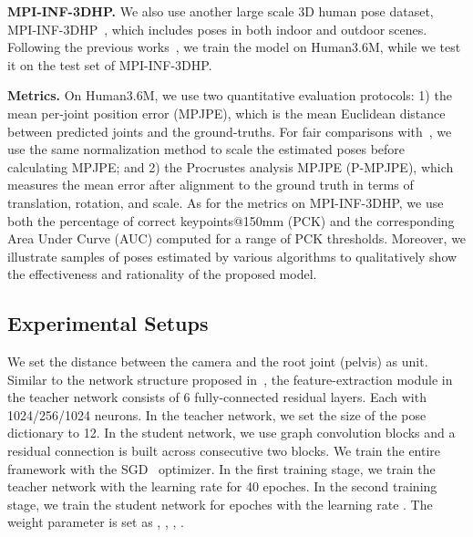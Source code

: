 \documentclass[letterpaper]{article} \usepackage{aaai21}  \usepackage{times}  \usepackage{helvet} \usepackage{courier}  \usepackage[hyphens]{url}  \usepackage{graphicx} \urlstyle{rm} \def\UrlFont{\rm}  \usepackage{natbib}  \usepackage{caption} \frenchspacing  \setlength{\pdfpagewidth}{8.5in}  \setlength{\pdfpageheight}{11in}
\begin{document}
\noindent\textbf{MPI-INF-3DHP.} We also use another large scale 3D human pose dataset, MPI-INF-3DHP~\cite{mehta2017monocular}, which includes poses in both indoor and outdoor scenes. Following the previous works~\cite{kanazawa2018end,mehta2017monocular,zhou2017towards}, we train the model on Human3.6M, while we test it on the test set of MPI-INF-3DHP.

\noindent\textbf{Metrics.}
On Human3.6M, we use two quantitative evaluation protocols: 1) the mean per-joint position error (MPJPE), which is the mean Euclidean distance between predicted joints and the ground-truths. For fair comparisons with~\cite{novotny2019c3dpo,kudo2018unsupervised}, we use the same normalization method to scale the estimated poses before calculating MPJPE; and 2) the Procrustes analysis MPJPE (P-MPJPE), which measures the mean error after alignment to the ground truth in terms of translation, rotation, and scale. As for the metrics on MPI-INF-3DHP, we use both the percentage of correct keypoints@150mm (PCK) and the corresponding Area Under Curve (AUC) computed for a range of PCK thresholds. Moreover, we illustrate samples of poses estimated by various algorithms to qualitatively show the effectiveness and rationality of the proposed model.

\subsection{Experimental Setups}
We set the distance between the camera and the root joint (pelvis)  as  unit. Similar to the network structure proposed in~\cite{novotny2019c3dpo}, the feature-extraction module in the teacher network consists of 6 fully-connected residual layers. Each with 1024/256/1024 neurons. In the teacher network, we set the size of the pose dictionary  to 12. In the student network, we use  graph convolution blocks and a residual connection is built across consecutive two blocks. We train the entire framework with the SGD~\cite{bottou2010large} optimizer. In the first training stage, we train the teacher network with the learning rate  for 40 epoches. In the second training stage, we train the student network for  epoches with the learning rate . The weight parameter is set as , , , .
\end{document}
